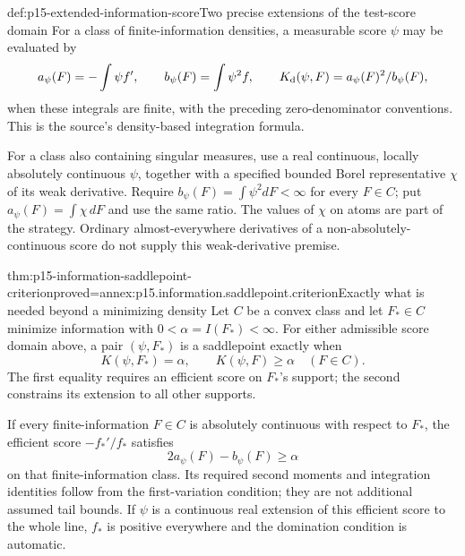 \begin{hbdefinition}{def:p15-extended-information-score}{Two precise extensions of the test-score domain}
For a class of finite-information densities, a measurable score
\(\psi\) may be evaluated by
\[
 a_\psi(F)=-\int\psi f',\qquad b_\psi(F)=\int\psi^2f,\qquad
 K_{\rm d}(\psi,F)=a_\psi(F)^2/b_\psi(F),
\]
when these integrals are finite, with the preceding zero-denominator
conventions. This is the source's density-based integration formula.

For a class also containing singular measures, use a real continuous,
locally absolutely continuous \(\psi\), together with a specified
bounded Borel representative \(\chi\) of its weak derivative.
Require \(b_\psi(F)=\int\psi^2dF<\infty\) for every \(F\in C\);
put \(a_\psi(F)=\int\chi\,dF\) and use the same ratio.
The values of \(\chi\) on atoms are part of the strategy.
Ordinary almost-everywhere derivatives of a non-absolutely-continuous
score do not supply this weak-derivative premise.
\end{hbdefinition}

\begin{hbtheorem}{thm:p15-information-saddlepoint-criterion}{proved=annex:p15.information.saddlepoint.criterion}{Exactly what is needed beyond a minimizing density}
Let \(C\) be a convex class and let \(F_*\in C\) minimize information
with \(0<\alpha=I(F_*)<\infty\).
For either admissible score domain above, a pair \((\psi,F_*)\)
is a saddlepoint exactly when
\[
 K(\psi,F_*)=\alpha,\qquad K(\psi,F)\geq\alpha\quad(F\in C).
\]
The first equality requires an efficient score on \(F_*\)'s support;
the second constrains its extension to all other supports.

If every finite-information \(F\in C\) is absolutely continuous
with respect to \(F_*\), the efficient score
\(-f_*'/f_*\) satisfies
\[
             2a_\psi(F)-b_\psi(F)\geq\alpha
\]
on that finite-information class. Its required second moments and
integration identities follow from the first-variation condition;
they are not additional assumed tail bounds.
If \(\psi\) is a continuous real extension of this efficient score
to the whole line, \(f_*\) is positive everywhere and the domination
condition is automatic.
\end{hbtheorem}

